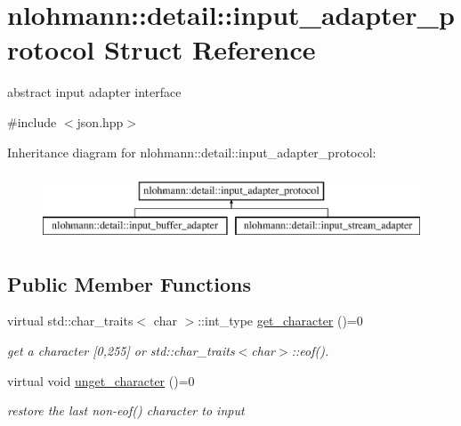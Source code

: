 \hypertarget{structnlohmann_1_1detail_1_1input__adapter__protocol}{}\section{nlohmann\+:\+:detail\+:\+:input\+\_\+adapter\+\_\+protocol Struct Reference}
\label{structnlohmann_1_1detail_1_1input__adapter__protocol}


abstract input adapter interface  




{\ttfamily \#include $<$json.\+hpp$>$}

Inheritance diagram for nlohmann\+:\+:detail\+:\+:input\+\_\+adapter\+\_\+protocol\+:\begin{figure}[H]
\begin{center}
\leavevmode
\includegraphics[height=2.000000cm]{d8/d5f/structnlohmann_1_1detail_1_1input__adapter__protocol}
\end{center}
\end{figure}
\subsection*{Public Member Functions}
\begin{DoxyCompactItemize}
\item 
\mbox{\label{structnlohmann_1_1detail_1_1input__adapter__protocol_aac10a6a4048a8ce8e2ed50277692a3ca}} 
virtual std\+::char\+\_\+traits$<$ char $>$\+::int\+\_\+type \mbox{\hyperlink{structnlohmann_1_1detail_1_1input__adapter__protocol_aac10a6a4048a8ce8e2ed50277692a3ca}{get\+\_\+character}} ()=0
\begin{DoxyCompactList}\small\item\em get a character \mbox{[}0,255\mbox{]} or std\+::char\+\_\+traits$<$char$>$\+::eof(). \end{DoxyCompactList}\item 
\mbox{\label{structnlohmann_1_1detail_1_1input__adapter__protocol_aeb5cac3e86e8df6cfe48cc42de2e9225}} 
virtual void \mbox{\hyperlink{structnlohmann_1_1detail_1_1input__adapter__protocol_aeb5cac3e86e8df6cfe48cc42de2e9225}{unget\+\_\+character}} ()=0
\begin{DoxyCompactList}\small\item\em restore the last non-\/eof() character to input \end{DoxyCompactList}\end{DoxyCompactItemize}


